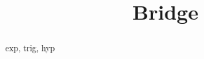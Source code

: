 \documentclass{ximera}
\title{Bridge}
\begin{document}
\begin{abstract}
exp, trig, hyp
\end{abstract}
\maketitle
\end{document}
